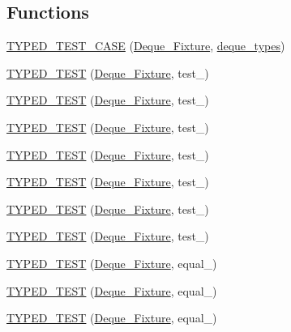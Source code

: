 \subsection*{Functions}
\begin{DoxyCompactItemize}
\item 
\hyperlink{TestDeque_8c_09_09_a79c5f0d583b012a972111954cd22db81}{T\-Y\-P\-E\-D\-\_\-\-T\-E\-S\-T\-\_\-\-C\-A\-S\-E} (\hyperlink{structDeque__Fixture}{Deque\-\_\-\-Fixture}, \hyperlink{TestDeque_8c_09_09_ad1999e4b3126317baa06a1266daa323c}{deque\-\_\-types})
\item 
\hyperlink{TestDeque_8c_09_09_af5a2ed6421ee6d5eb679eae3683f1553}{T\-Y\-P\-E\-D\-\_\-\-T\-E\-S\-T} (\hyperlink{structDeque__Fixture}{Deque\-\_\-\-Fixture}, test\-\_)
\item 
\hyperlink{TestDeque_8c_09_09_a9445564ac06f449cb7b0346d896cfee6}{T\-Y\-P\-E\-D\-\_\-\-T\-E\-S\-T} (\hyperlink{structDeque__Fixture}{Deque\-\_\-\-Fixture}, test\-\_)
\item 
\hyperlink{TestDeque_8c_09_09_ab747a50903eb4c8c1d97e2ba1e339f14}{T\-Y\-P\-E\-D\-\_\-\-T\-E\-S\-T} (\hyperlink{structDeque__Fixture}{Deque\-\_\-\-Fixture}, test\-\_)
\item 
\hyperlink{TestDeque_8c_09_09_acb06af50e98d4f807f373e582f0b2f37}{T\-Y\-P\-E\-D\-\_\-\-T\-E\-S\-T} (\hyperlink{structDeque__Fixture}{Deque\-\_\-\-Fixture}, test\-\_)
\item 
\hyperlink{TestDeque_8c_09_09_a9e0d3a490848b880d3652e00d3dddf1d}{T\-Y\-P\-E\-D\-\_\-\-T\-E\-S\-T} (\hyperlink{structDeque__Fixture}{Deque\-\_\-\-Fixture}, test\-\_)
\item 
\hyperlink{TestDeque_8c_09_09_ad1ddb105d8deae229d10353b5279c7da}{T\-Y\-P\-E\-D\-\_\-\-T\-E\-S\-T} (\hyperlink{structDeque__Fixture}{Deque\-\_\-\-Fixture}, test\-\_)
\item 
\hyperlink{TestDeque_8c_09_09_a1336cf73d3b4924296ef15ae9cec4c71}{T\-Y\-P\-E\-D\-\_\-\-T\-E\-S\-T} (\hyperlink{structDeque__Fixture}{Deque\-\_\-\-Fixture}, test\-\_)
\item 
\hyperlink{TestDeque_8c_09_09_a990892e30546b3fd1cba3310cc283aff}{T\-Y\-P\-E\-D\-\_\-\-T\-E\-S\-T} (\hyperlink{structDeque__Fixture}{Deque\-\_\-\-Fixture}, equal\-\_)
\item 
\hyperlink{TestDeque_8c_09_09_a4e43a73247e8f5da9dd4a62ad2a4370e}{T\-Y\-P\-E\-D\-\_\-\-T\-E\-S\-T} (\hyperlink{structDeque__Fixture}{Deque\-\_\-\-Fixture}, equal\-\_)
\item 
\hyperlink{TestDeque_8c_09_09_ad7e73dcab1439dd30a761cc2449e556d}{T\-Y\-P\-E\-D\-\_\-\-T\-E\-S\-T} (\hyperlink{structDeque__Fixture}{Deque\-\_\-\-Fixture}, equal\-\_)

\end{DoxyCompactItemize}
